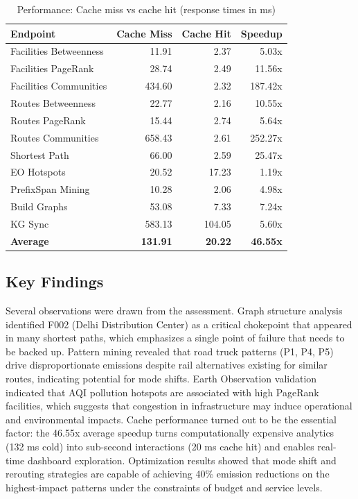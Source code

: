 \documentclass[conference]{IEEEtran}
\begin{document}
\begin{table}[!t]
\centering
\caption{Performance: Cache miss vs cache hit (response times in ms)}
\small
\begin{tabular}{@{}lrrr@{}}
\toprule
\textbf{Endpoint} & \textbf{Cache Miss} & \textbf{Cache Hit} & \textbf{Speedup} \\
\midrule
Facilities Betweenness & 11.91 & 2.37 & 5.03x \\
Facilities PageRank & 28.74 & 2.49 & 11.56x \\
Facilities Communities & 434.60 & 2.32 & 187.42x \\
Routes Betweenness & 22.77 & 2.16 & 10.55x \\
Routes PageRank & 15.44 & 2.74 & 5.64x \\
Routes Communities & 658.43 & 2.61 & 252.27x \\
Shortest Path & 66.00 & 2.59 & 25.47x \\
EO Hotspots & 20.52 & 17.23 & 1.19x \\
PrefixSpan Mining & 10.28 & 2.06 & 4.98x \\
Build Graphs & 53.08 & 7.33 & 7.24x \\
KG Sync & 583.13 & 104.05 & 5.60x \\
\midrule
\textbf{Average} & \textbf{131.91} & \textbf{20.22} & \textbf{46.55x} \\
\bottomrule
\end{tabular}
\label{tab:performance}
\end{table}

\subsection{Key Findings}
Several observations were drawn from the assessment. Graph structure analysis identified F002 (Delhi Distribution Center) as a critical chokepoint that appeared in many shortest paths, which emphasizes a single point of failure that needs to be backed up. Pattern mining revealed that road truck patterns (P1, P4, P5) drive disproportionate emissions despite rail alternatives existing for similar routes, indicating potential for mode shifts. Earth Observation validation indicated that AQI pollution hotspots are associated with high PageRank facilities, which suggests that congestion in infrastructure may induce operational and environmental impacts. Cache performance turned out to be the essential factor: the 46.55x average speedup turns computationally expensive analytics (132 ms cold) into sub-second interactions (20 ms cache hit) and enables real-time dashboard exploration. Optimization results showed that mode shift and rerouting strategies are capable of achieving 40\% emission reductions on the highest-impact patterns under the constraints of budget and service levels.
\end{document}
